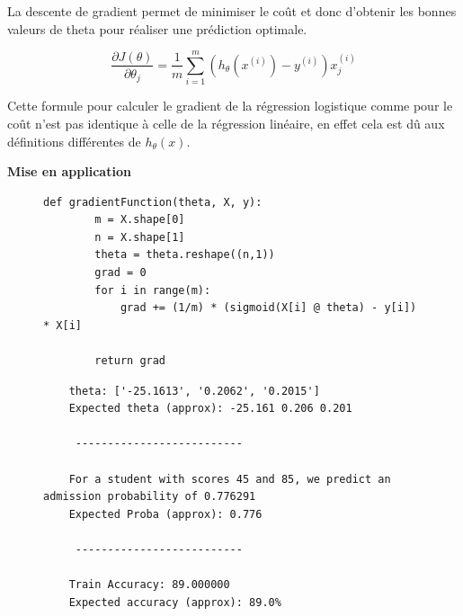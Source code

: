 La descente de gradient permet de minimiser le coût et donc d'obtenir les bonnes valeurs de theta pour réaliser une prédiction optimale.

\begin{equation}\label{eq:cout}
    \frac{\partial J(\theta)}{\partial \theta_j} = \frac{1}{m} \sum_{i=1}^{m} (h_\theta(x^{(i)}) - y^{(i)}) x_j^{(i)}
\end{equation}

\noindent
Cette formule pour calculer le gradient de la régression logistique comme pour le coût n'est pas identique à celle de la régression linéaire, en effet cela est dû aux définitions différentes de \( h_\theta (x) \).

\vspace{.5cm}
    \noindent
    \textbf{Mise en application}
    \vspace{.2cm}

\begin{figure}[!h]
    \begin{minipage}{.48\linewidth}
\begin{verbatim}
def gradientFunction(theta, X, y):
        m = X.shape[0]  
        n = X.shape[1]   
        theta = theta.reshape((n,1)) 
        grad = 0
        for i in range(m):
            grad += (1/m) * (sigmoid(X[i] @ theta) - y[i]) * X[i]

        return grad
\end{verbatim}   
    \end{minipage}\hfill
    \begin{minipage}{.48\linewidth}
\begin{verbatim}
    theta: ['-25.1613', '0.2062', '0.2015']
    Expected theta (approx): -25.161 0.206 0.201
    
     -------------------------- 
    
    For a student with scores 45 and 85, we predict an admission probability of 0.776291
    Expected Proba (approx): 0.776
    
     -------------------------- 
    
    Train Accuracy: 89.000000
    Expected accuracy (approx): 89.0%

\end{verbatim}   
    \end{minipage}
\end{figure}


